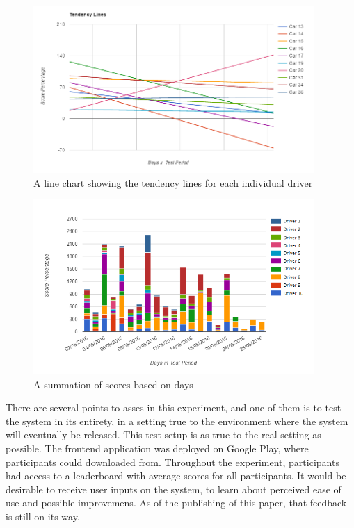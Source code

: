 \begin{figure}[h]
\begin{minipage}{0.95\textwidth}
\centering
\includegraphics[width=0.95\textwidth]{Pictures/tendenslinjer}
\caption{A line chart showing the tendency lines for each individual driver}
\label{fig:tendencylines}
\end{minipage}
\end{figure}
\begin{figure}[h]
\begin{minipage}{0.95\textwidth}
\centering
\includegraphics[width=0.95\textwidth]{Pictures/summationoftripscore}
\caption{A summation of scores based on days}
\label{fig:summationoftripscore}
\end{minipage}
\end{figure}

There are several points to asses in this experiment, and one of them is to test the system in its entirety, in a setting true to the environment where the system will eventually be released. This test setup is as true to the real setting as possible. The frontend application was deployed on Google Play, where participants could downloaded from. Throughout the experiment, participants had access to a leaderboard with average scores for all participants. 
It would be desirable to receive user inputs on the system, to learn about perceived ease of use and possible improvemens. As of the publishing of this paper, that feedback is still on its way.

